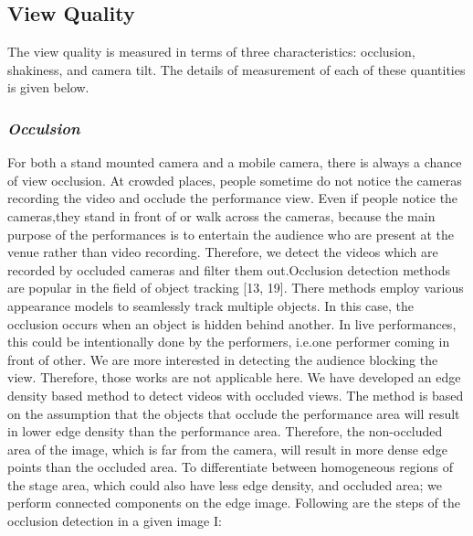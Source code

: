 \documentclass{sig-alternate}
\begin{document}
\subsection{View Quality}
The view quality is measured in terms of three characteristics: occlusion, shakiness, and camera tilt. The details of measurement of each of these quantities is given below.
\subsubsection{\textit{Occulsion}}
For both a stand mounted camera and a mobile camera, there is always a chance of view occlusion. At crowded places, people sometime do not notice the cameras recording the video and occlude the performance view. Even if people notice the cameras,they stand in front of or walk across the cameras, because the main purpose of the performances is to entertain the audience who are
present at the venue rather than video recording.\cite{web:5} Therefore, we detect the videos which are recorded by occluded cameras and filter them out.Occlusion detection methods are popular in the field of object tracking [13, 19]. There methods employ various appearance models to seamlessly track multiple objects. In this case, the occlusion occurs when an object is hidden behind another. In live performances, this could be intentionally done by the performers, i.e.one performer coming in front of other. We are more interested in detecting the audience blocking the view. Therefore, those works are not applicable here.
We have developed an edge density based method to detect videos with occluded views. The method is based on the assumption that the objects that occlude the performance area will result in lower edge density than the performance area. Therefore, the non-occluded area of the image, which is far from the camera, will result in more dense edge points than the occluded area. To differentiate between homogeneous regions of the stage area, which could also have less edge density, and occluded area; we perform connected components on the edge image. Following are the steps of the occlusion detection in a given image I:
\end{document}
